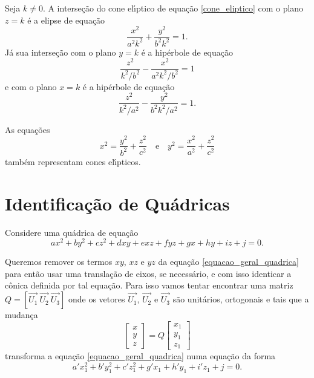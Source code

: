 Seja $k \ne 0$. A interse\c{c}\~ao do cone el{\'\i}ptico de equa\c{c}\~ao \eqref{cone_eliptico} com o plano $z = k$ \'e a elipse de equa\c{c}\~ao
\[
	\dfrac{x^2}{a^2k^2} + \dfrac{y^2}{b^2k^2} = 1.
\]
J\'a sua interse\c{c}\~ao com o plano $y = k$ \'e a hip\'erbole de equa\c{c}\~ao
\[
	\dfrac{z^2}{k^2/b^2} - \dfrac{x^2}{a^2k^2/b^2} = 1
\]
e com o plano $x = k$ \'e a hip\'erbole de equa\c{c}\~ao
\[
	\dfrac{z^2}{k^2/a^2} - \dfrac{y^2}{b^2k^2/a^2} = 1.
\]

As equa\c{c}\~oes
\[
	x^2 = \dfrac{y^2}{b^2} + \dfrac{z^2}{c^2}\quad \mbox{e}\quad y^2 = \dfrac{x^2}{a^2} + \dfrac{z^2}{c^2}
\]
tamb\'em representam cones el{\'\i}pticos.

\section{Identifica\c{c}\~ao de Qu\'adricas} %
\label{sec:identificacao_de_quadricas}

Considere uma qu\'adrica de equa\c{c}\~ao
\begin{equation}\label{equacao_geral_quadrica}
  ax^2 + by^2 + cz^2 + dxy + exz + fyz + gx + hy + iz + j = 0.
\end{equation}

Queremos remover os termos $xy$, $xz$ e $yz$ da equa\c{c}\~ao \eqref{equacao_geral_quadrica} para ent\~ao usar uma transla\c{c}\~ao de eixos, se necess\'ario, e com isso identicar a c\^onica definida por tal equa\c{c}\~ao. Para isso vamos tentar encontrar uma matriz $Q = [\vec{U_1}\ \vec{U_2}\ \vec{U_3}]$ onde os vetores $\vec{U_1}$, $\vec{U_2}$ e $\vec{U_3}$ s\~ao unit\'arios, ortogonais e tais que a mudan\c{c}a
\begin{equation}\label{substituicao_quadrica}
	\begin{bmatrix}
		x\\
		y\\
		z
	\end{bmatrix} = Q \begin{bmatrix}
		x_1\\
		y_1\\
		z_1
	\end{bmatrix}
\end{equation}
transforma a equa\c{c}\~ao \eqref{equacao_geral_quadrica} numa equa\c{c}\~ao da forma
\begin{equation}\label{equacao_rotacionada_quadrica}
  a'x_1^2 + b'y_1^2 + c'z_1^2 + g'x_1 + h'y_1 + i'z_1 + j = 0.
\end{equation}

